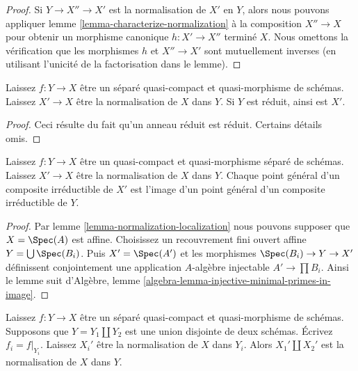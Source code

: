 \begin{proof}

Si $Y \to X'' \to X'$ est la normalisation de $X'$ en $Y$, alors nous pouvons appliquer lemme \ref{lemma-characterize-normalization}
à la composition $X'' \to X$ pour obtenir un morphisme canonique
$h : X' \to X''$ terminé $X$. Nous omettons la vérification que les morphismes $h$ et $X'' \to X'$ sont mutuellement inverses (en utilisant l'unicité de la factorisation dans le lemme).

\end{proof}

\begin{lemma}

\label{lemma-normalization-in-reduced}
Laissez $f : Y \to X$ être un séparé quasi-compact et quasi-morphisme de schémas. Laissez $X' \to X$ être la normalisation de $X$ dans $Y$. Si $Y$ est réduit, ainsi est $X'$.
\end{lemma}

\begin{proof}
Ceci résulte du fait qu'un anneau réduit est réduit. Certains détails omis.
\end{proof}

\begin{lemma}

\label{lemma-normalization-generic}
Laissez $f : Y \to X$ être un quasi-compact et quasi-morphisme séparé de schémas. Laissez $X' \to X$ être la normalisation de $X$ dans $Y$. Chaque point général d'un composite irréductible de $X'$ est l'image d'un point général d'un composite irréductible de $Y$.
\end{lemma}

\begin{proof}
Par lemme \ref{lemma-normalization-localization} nous pouvons supposer que $X = \Spec(A)$ est affine. Choisissez un recouvrement fini ouvert affine $Y = \bigcup \Spec(B_i)$. Puis $X' = \Spec(A')$ et les morphismes $\Spec(B_i) \to Y \to X'$ définissent conjointement une application $A$-algèbre injectable $A' \to \prod B_i$. Ainsi le lemme suit d'Algèbre, lemme \ref{algebra-lemma-injective-minimal-primes-in-image}.
\end{proof}

\begin{lemma}

\label{lemma-normalization-in-disjoint-union}
Laissez $f : Y \to X$ être un séparé quasi-compact et quasi-morphisme de schémas. Supposons que $Y = Y_1 \amalg Y_2$ est une union disjointe de deux schémas. Écrivez $f_i = f|_{Y_i}$. Laissez $X_i'$ être la normalisation de $X$ dans $Y_i$. Alors $X_1' \amalg X_2'$ est la normalisation de $X$ dans $Y$.
\end{lemma}

